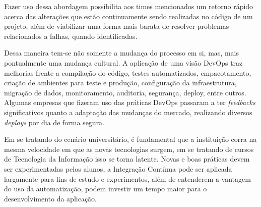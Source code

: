 Fazer uso dessa abordagem possibilita aos times mencionados um retorno rápido acerca das alterações que estão continuamente sendo realizadas no código de um projeto, além de viabilizar uma forma mais barata de resolver problemas relacionados a falhas, quando identificadas.

Dessa maneira tem-se não somente a mudança do processo em si, mas, mais pontualmente uma mudança cultural. A aplicação de uma visão DevOps traz melhorias frente a compilação do código, testes automatizados, empacotamento, criação de ambientes para teste e produção, configuração da infraestrutura, migração de dados, monitoramento, auditoria, segurança, deploy, entre outros. Algumas empresas que fizeram uso das práticas DevOps passaram a ter \textit{feedbacks }significativos quanto a adaptação das mudanças do mercado, realizando diversos \textit{deploys} por dia de forma segura.\cite{sato2014devops}

Em se tratando do cenário universitário, é fundamental que a instituição corra na mesma velocidade em que as novas tecnologias surgem, em se tratando de cursos de Tecnologia da Informação isso se torna latente. Novas e boas práticas devem ser experimentadas pelos alunos, a Integração Contínua pode ser aplicada largamente para fins de estudo e experimentos, além de entenderem a vantagem do uso da automatização, podem investir um tempo maior para o desenvolvimento da aplicação.